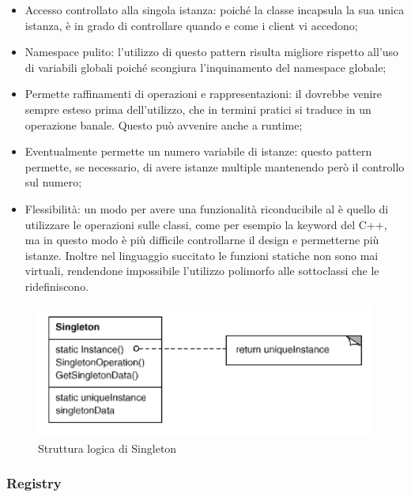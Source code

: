 \begin{itemize}

	\item Accesso controllato alla singola istanza: poiché la classe  incapsula la sua unica istanza, è in grado di controllare quando e come i client vi accedono;
	\item Namespace pulito: l'utilizzo di questo pattern risulta migliore rispetto all'uso di variabili globali poiché scongiura l'inquinamento del namespace globale;
	\item Permette raffinamenti di operazioni e rappresentazioni: il  dovrebbe venire sempre esteso prima dell'utilizzo, che in termini pratici si traduce in un operazione banale. Questo può avvenire anche a runtime;
	\item Eventualmente permette un numero variabile di istanze: questo pattern permette, se necessario, di avere istanze multiple mantenendo però il controllo sul numero;
	\item Flessibilità: un modo per avere una funzionalità riconducibile al  è quello di utilizzare le operazioni sulle classi, come per esempio la keyword  del C++, ma in questo modo è più difficile controllarne il design e permetterne più istanze. Inoltre nel linguaggio succitato le funzioni statiche non sono mai virtuali, rendendone impossibile l'utilizzo polimorfo alle sottoclassi che le ridefiniscono.
	
\end{itemize}

\begin{figure}[H]
\centering \includegraphics[width=\textwidth]{patterns/Singleton.png}
\caption{Struttura logica di Singleton}
\label{fig:singleton}
\end{figure}

\subsubsection{Registry} %

